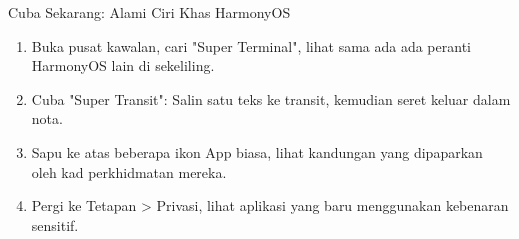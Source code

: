 \begin{tcbpractice}{Cuba Sekarang: Alami Ciri Khas HarmonyOS}
\begin{enumerate}
  \item Buka pusat kawalan, cari "Super Terminal", lihat sama ada ada peranti HarmonyOS lain di sekeliling.
  \item Cuba "Super Transit": Salin satu teks ke transit, kemudian seret keluar dalam nota.
  \item Sapu ke atas beberapa ikon App biasa, lihat kandungan yang dipaparkan oleh kad perkhidmatan mereka.
  \item Pergi ke Tetapan > Privasi, lihat aplikasi yang baru menggunakan kebenaran sensitif.
\end{enumerate}

\end{tcbpractice}
